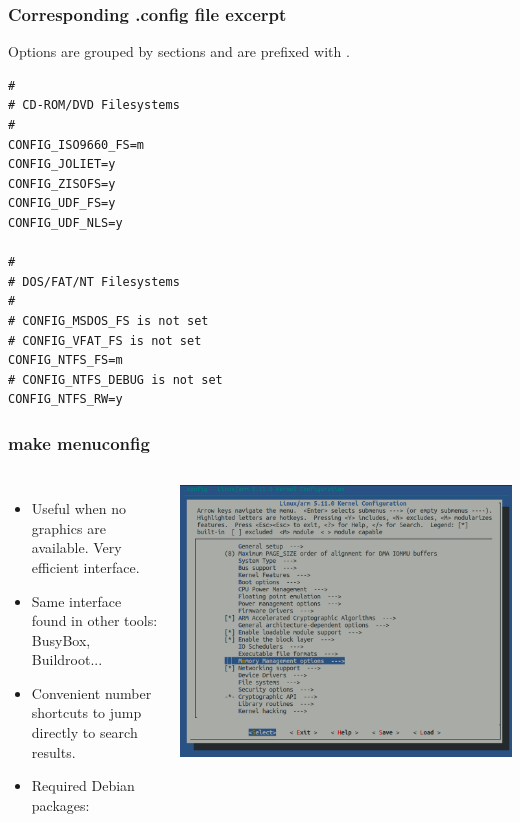 \begin{frame}[fragile]
  \frametitle{Corresponding .config file excerpt}
  Options are grouped by sections and are prefixed with
  .
\footnotesize
\begin{verbatim}
#
# CD-ROM/DVD Filesystems
#
CONFIG_ISO9660_FS=m
CONFIG_JOLIET=y
CONFIG_ZISOFS=y
CONFIG_UDF_FS=y
CONFIG_UDF_NLS=y

#
# DOS/FAT/NT Filesystems
#
# CONFIG_MSDOS_FS is not set
# CONFIG_VFAT_FS is not set
CONFIG_NTFS_FS=m
# CONFIG_NTFS_DEBUG is not set
CONFIG_NTFS_RW=y
\end{verbatim}
\end{frame}

\begin{frame}
  \frametitle{make menuconfig}
  \begin{columns}
    \begin{itemize}
      \item Useful when no graphics are available. Very efficient interface.
      \item Same interface found in other tools: BusyBox, Buildroot...
      \item Convenient number shortcuts to jump directly to search results.
      \item Required Debian packages: 
    \end{itemize}
    \includegraphics[width=\textwidth]{slides/sysdev-kernel-building/menuconfig-screenshot.png}
  \end{columns}
\end{frame}


